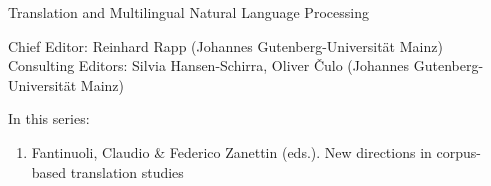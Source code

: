 {\large Translation and Multilingual Natural Language Processing}

\bigskip

Chief Editor: Reinhard Rapp (Johannes Gutenberg-Universität Mainz) \\
Consulting Editors: Silvia Hansen-Schirra, 
Oliver Čulo (Johannes Gutenberg-Universität Mainz)

\bigskip

In this series:

\begin{enumerate}
\item Fantinuoli, Claudio \& Federico Zanettin (eds.). New directions in corpus-based translation studies
\end{enumerate}



